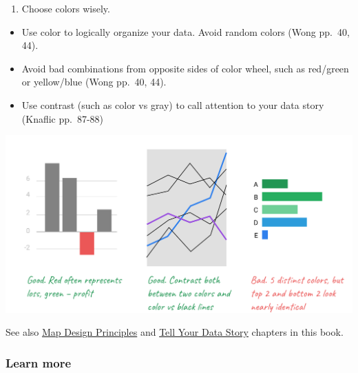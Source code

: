 \documentclass[
  english,
]{book}
\providecommand{\tightlist}{%
  \setlength{\itemsep}{0pt}\setlength{\parskip}{0pt}}
\begin{document}
\begin{enumerate}
\def\labelenumi{\arabic{enumi})}
\setcounter{enumi}{17}
\tightlist
\item
  Choose colors wisely.
\end{enumerate}

\begin{itemize}
\tightlist
\item
  Use color to logically organize your data. Avoid random colors (Wong pp.~40, 44).
\item
  Avoid bad combinations from opposite sides of color wheel, such as red/green or yellow/blue (Wong pp.~40, 44).
\item
  Use contrast (such as color vs gray) to call attention to your data story (Knaflic pp.~87-88)
\end{itemize}

\includegraphics{images/05-chart/Chart - 18 - Colors.png}

See also \href{map-design}{Map Design Principles} and \href{story}{Tell Your Data Story} chapters in this book.

\hypertarget{learn-more-5}{%
\subsubsection*{Learn more}\label{learn-more-5}}
\end{document}
